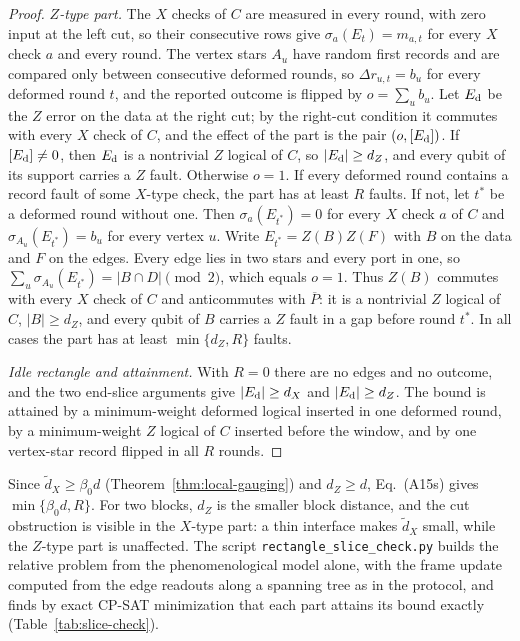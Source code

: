 \documentclass[aps,prx,reprint,superscriptaddress,nofootinbib,floatfix,longbibliography]{revtex4-2}
\theoremstyle{definition}
\begin{document}
\begin{proof}
\emph{$Z$-type part.}  The $X$ checks of $C$ are measured in every round, with
zero input at the left cut, so their consecutive rows give
$\sigma_a(E_t)=m_{a,t}$ for every $X$ check $a$ and every round.  The vertex
stars $A_u$ have random first records and are compared only between
consecutive deformed rounds, so $\Delta r_{u,t}=b_u$ for every deformed round
$t$, and the reported outcome is flipped by $o=\sum_ub_u$.  Let $E_{\rm d}$ be
the $Z$ error on the data at the right cut; by the right-cut condition it
commutes with every $X$ check of $C$, and the effect of the part is the pair
$(o,[E_{\rm d}])$.  If $[E_{\rm d}]\neq0$, then $E_{\rm d}$ is a nontrivial
$Z$ logical of $C$, so $|E_{\rm d}|\geq d_Z$, and every qubit of its support
carries a $Z$ fault.  Otherwise $o=1$.  If every deformed round contains a
record fault of some $X$-type check, the part has at least $R$ faults.  If
not, let $t^\ast$ be a deformed round without one.  Then $\sigma_a(E_{t^\ast})=0$
for every $X$ check $a$ of $C$ and $\sigma_{A_u}(E_{t^\ast})=b_u$ for every
vertex $u$.  Write $E_{t^\ast}=Z(B)Z(F)$ with $B$ on the data and $F$ on the
edges.  Every edge lies in two stars and every port in one, so
$\sum_u\sigma_{A_u}(E_{t^\ast})=|B\cap D|\pmod2$, which equals $o=1$.  Thus
$Z(B)$ commutes with every $X$ check of $C$ and anticommutes with
$\overline P$: it is a nontrivial $Z$ logical of $C$, $|B|\geq d_Z$, and
every qubit of $B$ carries a $Z$ fault in a gap before round $t^\ast$.  In all
cases the part has at least $\min\{d_Z,R\}$ faults.

\emph{Idle rectangle and attainment.}  With $R=0$ there are no edges and no
outcome, and the two end-slice arguments give $|E_{\rm d}|\geq d_X$ and
$|E_{\rm d}|\geq d_Z$.  The bound is attained by a minimum-weight deformed
logical inserted in one deformed round, by a minimum-weight $Z$ logical of
$C$ inserted before the window, and by one vertex-star record flipped in all
$R$ rounds.
\end{proof}

Since $\widetilde d_X\geq\beta_0d$ (Theorem~\ref{thm:local-gauging}) and
$d_Z\geq d$, Eq.~(A15s) gives $\min\{\beta_0d,R\}$.  For two blocks, $d_Z$ is
the smaller block distance, and the cut obstruction is visible in the
$X$-type part: a thin interface makes $\widetilde d_X$ small, while the
$Z$-type part is unaffected.  The script \texttt{rectangle\_slice\_check.py}
builds the relative problem from the phenomenological model alone, with the
frame update computed from the edge readouts along a spanning tree as in the
protocol, and finds by exact CP-SAT minimization that each part attains its
bound exactly (Table~\ref{tab:slice-check}).
\end{document}
